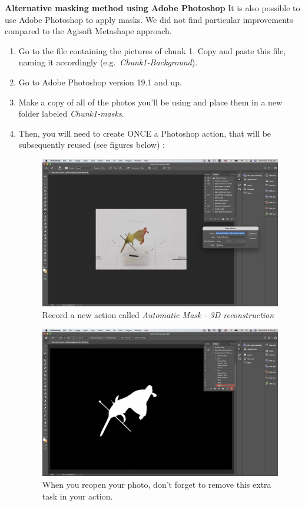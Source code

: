 \documentclass[
]{book}
\theoremstyle{definition}
\theoremstyle{definition}
\theoremstyle{definition}
\theoremstyle{definition}
\theoremstyle{remark}
\begin{document}
\textbf{Alternative masking method using Adobe Photoshop} It is also possible
to use Adobe Photoshop to apply masks. We did not find particular
improvements compared to the Agisoft Metashape approach.

\begin{enumerate}
\def\labelenumi{\arabic{enumi}.}
\item
  Go to the file containing the pictures of chunk 1. Copy and paste
  this file, naming it accordingly (e.g.~\emph{Chunk1-Background}).
\item
  Go to Adobe Photoshop version 19.1 and up.
\item
  Make a copy of all of the photos you'll be using and place them in a
  new folder labeled \emph{Chunk1-masks}.
\item
  Then, you will need to create ONCE a Photoshop action, that will be
  subsequently reused (see figures below) :

  \begin{figure}
  \centering
  \includegraphics{Figures/mask_1.png}
  \caption{Record a new action called \emph{Automatic Mask - 3D
  reconstruction}}
  \end{figure}

  \begin{figure}
  \centering
  \includegraphics{Figures/mask_2.png}
  \caption{When you reopen your photo, don't forget to remove this extra task
  in your action.}
  \end{figure}


\end{enumerate}
\end{document}
